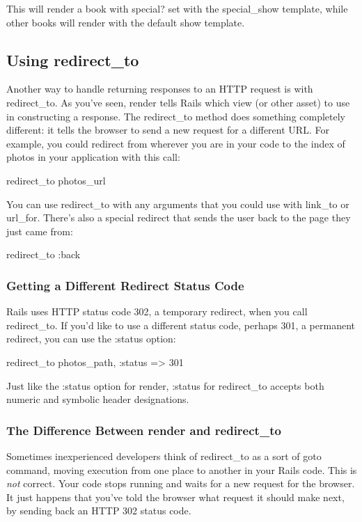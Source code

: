 \documentclass[10pt]{book}
\newenvironment{code}{%
  \scriptsize
    \verbatim
}{%
    \endverbatim
    \newline
}
\begin{document}
This will render a book with special? set with the special\_show template, while other books will render with the default show template.

\subsection{ Using redirect\_to}

Another way to handle returning responses to an HTTP request is with redirect\_to. As you’ve seen, render tells Rails which view (or other asset) to use in constructing a response. The redirect\_to method does something completely different: it tells the browser to send a new request for a different URL. For example, you could redirect from wherever you are in your code to the index of photos in your application with this call:
\begin{code}
redirect_to photos_url
\end{code}

You can use redirect\_to with any arguments that you could use with link\_to or url\_for. There’s also a special redirect that sends the user back to the page they just came from:
\begin{code}
redirect_to :back
\end{code}

\subsubsection{ Getting a Different Redirect Status Code}

Rails uses HTTP status code 302, a temporary redirect, when you call redirect\_to. If you’d like to use a different status code, perhaps 301, a permanent redirect, you can use the :status option:
\begin{code}
redirect_to photos_path, :status => 301
\end{code}

Just like the :status option for render, :status for redirect\_to accepts both numeric and symbolic header designations.

\subsubsection{ The Difference Between render and redirect\_to}

Sometimes inexperienced developers think of redirect\_to as a sort of goto command, moving execution from one place to another in your Rails code. This is \emph{not}  correct. Your code stops running and waits for a new request for the  browser. It just happens that you’ve told the browser what request it  should make next, by sending back an HTTP 302 status code.
\end{document}
